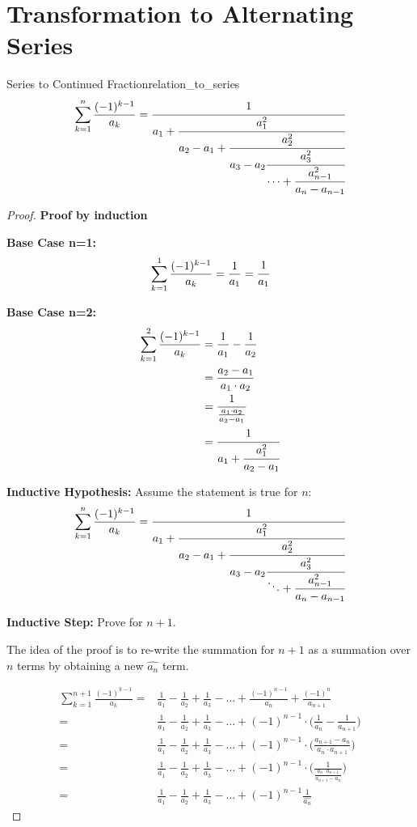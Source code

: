 \documentclass[a4paper]{article}
\begin{document}
\section{Transformation to Alternating Series}\label{cf:sec:relation-to-alternating-series}

\begin{mytheorem}{Series to Continued Fraction}{relation_to_series}
  \[
    \sum_{k=1}^{n} \frac{(-1)^{k-1}}{a_k} = \cfrac{1}{a_1+\cfrac{a_{1}^{2}}{a_2 - a_1 +\cfrac{a_2^2}{a_3 - a_2
          \cfrac{a_3^2}{\cdots + \cfrac{a_{n-1}^2}{a_n - a_{n-1}}}}}}
  \]

  \begin{proof}
    \textbf{Proof by induction}

    \textbf{Base Case n=1:}
    \[ \sum_{k=1}^{1} \frac{(-1)^{k-1}}{a_k} = \frac{1}{a_1} = \cfrac{1}{a_1} \]

    \textbf{Base Case n=2:}
    \begin{align*}
      \sum_{k=1}^{2} \frac{(-1)^{k-1}}{a_k} & = \frac{1}{a_1} - \frac{1}{a_2}             \\
                                            & = \frac{a_2 - a_1}{a_1 \cdot a_2}           \\
                                            & = \frac{1}{\frac{a_1 \cdot a_2}{a_2 - a_1}} \\
                                            & = \cfrac{1}{a_1 + \cfrac{a_1^2}{a_2 - a_1}}
    \end{align*}

    \textbf{Inductive Hypothesis:} Assume the statement is true for $n$:
    \[ \sum_{k=1}^{n} \frac{(-1)^{k-1}}{a_k} = \cfrac{1}{a_1+\cfrac{a_{1}^{2}}{a_2 - a_1 +\cfrac{a_2^2}{a_3 - a_2
            \cfrac{a_3^2}{\ddots + \cfrac{a_{n-1}^2}{a_n - a_{n-1}}}}}} \]

    \textbf{Inductive Step:} Prove for $n+1$.

    The idea of the proof is to re-write the summation for $n+1$ as a summation over $n$ terms by obtaining a new $\widehat{a_n}$ term.

    \begin{align*}
      \sum_{k=1}^{n+1} \frac{(-1)^{k-1}}{a_k} = & \frac{1}{a_1} - \frac{1}{a_2} + \frac{1}{a_3} - \dots + \frac{(-1)^{n-1}}{a_{n}} + \frac{(-1)^{n}}{a_{n+1}}
      \\
      =                                         & \frac{1}{a_1} - \frac{1}{a_2} + \frac{1}{a_3} - \dots + (-1)^{n-1} \cdot \Big( \frac{1}{a_{n}} - \frac{1}{a_{n+1}} \Big)
      \\
      =                                         & \frac{1}{a_1} - \frac{1}{a_2} + \frac{1}{a_3} - \dots + (-1)^{n-1} \cdot \Big( \frac{a_{n+1} - a_{n}}{a_{n}\cdot a_{n+1}} \Big)
      \\
      =                                         & \frac{1}{a_1} - \frac{1}{a_2} + \frac{1}{a_3} - \dots + (-1)^{n-1} \cdot \Big( \frac{1}{\frac{a_{n}\cdot a_{n+1}}{a_{n+1} - a_{n}}}  \Big)
      \\
      =                                         & \frac{1}{a_1} - \frac{1}{a_2} + \frac{1}{a_3} - \dots + (-1)^{n-1} \frac{1}{\widehat{a_n}}
    \end{align*}


\end{proof}
\end{mytheorem}
\end{document}
